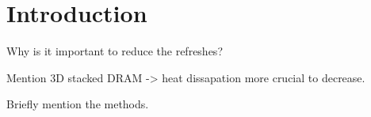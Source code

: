 \section{Introduction}
\label{sec:int}
Why is it important to reduce the refreshes?

Mention 3D stacked DRAM -> heat dissapation more crucial to decrease.

Briefly mention the methods.